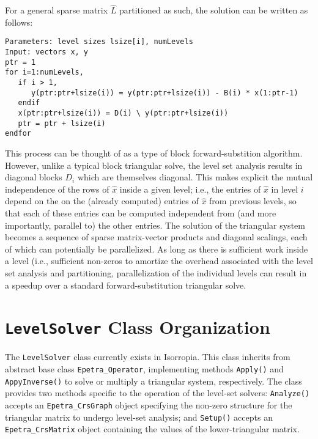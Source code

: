 \documentclass[12pt]{article}
\begin{document}
For a general sparse matrix $\hat{L}$ partitioned as such, the solution can be written as follows:
\begin{verbatim}
Parameters: level sizes lsize[i], numLevels
Input: vectors x, y
ptr = 1
for i=1:numLevels,
   if i > 1,
      y(ptr:ptr+lsize(i)) = y(ptr:ptr+lsize(i)) - B(i) * x(1:ptr-1)
   endif
   x(ptr:ptr+lsize(i)) = D(i) \ y(ptr:ptr+lsize(i))
   ptr = ptr + lsize(i)
endfor
\end{verbatim}

This process can be thought of as a type of block forward-substition algorithm. However, unlike a typical block triangular solve, the level set analysis results in diagonal blocks $D_i$ which are themselves diagonal. This makes explicit the mutual independence of the rows of $\hat{x}$ inside a given level; i.e., the entries of $\hat{x}$ in level $i$ depend on the on the (already computed) entries of $\hat{x}$ from previous levels, so that each of these entries can be computed independent from (and more importantly, parallel to) the other entries. The solution of the triangular system becomes a sequence of sparse matrix-vector products and diagonal scalings, each of which can potentially be parallelized. As long as there is sufficient work inside a level (i.e., sufficient non-zeros to amortize the overhead associated with the level set analysis and partitioning, parallelization of the individual levels can result in a speedup over a standard forward-substitution triangular solve.

\section{\texttt{LevelSolver} Class Organization}

The \texttt{LevelSolver} class currently exists in Isorropia. This class inherits from abstract base class \texttt{Epetra\_Operator}, implementing methods \texttt{Apply()} and \texttt{AppyInverse()} to solve or multiply a triangular system, respectively. The class provides two methods specific to the operation of the level-set solvers: \texttt{Analyze()} accepts an \texttt{Epetra\_CrsGraph} object specifying the non-zero structure for the triangular matrix to undergo level-set analysis; and \texttt{Setup()} accepts an \texttt{Epetra\_CrsMatrix} object containing the values of the lower-triangular matrix. 
\end{document}
